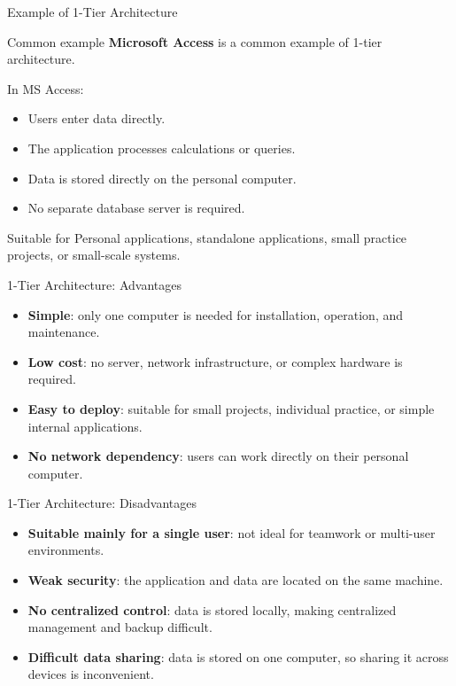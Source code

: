 \documentclass[aspectratio=169,11pt]{beamer}
\newcommand{\keyword}[1]{\textcolor{accent}{\textbf{#1}}}
\newcommand{\tightlist}{\setlength{\itemsep}{2pt}\setlength{\parskip}{0pt}}
\begin{document}
\begin{frame}{Example of 1-Tier Architecture}
\small
\begin{block}{Common example}
\keyword{Microsoft Access} is a common example of 1-tier architecture.
\end{block}

In MS Access:
\begin{itemize}
\tightlist
  \item Users enter data directly.
  \item The application processes calculations or queries.
  \item Data is stored directly on the personal computer.
  \item No separate database server is required.
\end{itemize}

\begin{exampleblock}{Suitable for}
Personal applications, standalone applications, small practice projects, or small-scale systems.
\end{exampleblock}
\end{frame}

\begin{frame}{1-Tier Architecture: Advantages}
\small
\begin{itemize}
\tightlist
  \item \keyword{Simple}: only one computer is needed for installation, operation, and maintenance.
  \item \keyword{Low cost}: no server, network infrastructure, or complex hardware is required.
  \item \keyword{Easy to deploy}: suitable for small projects, individual practice, or simple internal applications.
  \item \keyword{No network dependency}: users can work directly on their personal computer.
\end{itemize}
\end{frame}

\begin{frame}{1-Tier Architecture: Disadvantages}
\small
\begin{itemize}
\tightlist
  \item \keyword{Suitable mainly for a single user}: not ideal for teamwork or multi-user environments.
  \item \keyword{Weak security}: the application and data are located on the same machine.
  \item \keyword{No centralized control}: data is stored locally, making centralized management and backup difficult.
  \item \keyword{Difficult data sharing}: data is stored on one computer, so sharing it across devices is inconvenient.
\end{itemize}
\end{frame}
\end{document}
